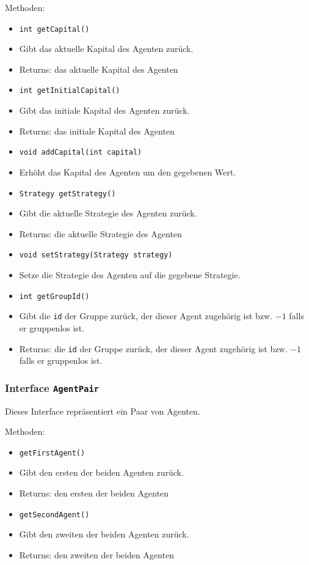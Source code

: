 \documentclass[parskip=full,11pt]{scrartcl}
\begin{document}
Methoden:
\begin{itemize}\itemsep -10pt
\item \texttt{int getCapital()}
\item[] Gibt das aktuelle Kapital des Agenten zurück.
\item[] Returns: das aktuelle Kapital des Agenten

\item \texttt{int getInitialCapital()}
\item[] Gibt das initiale Kapital des Agenten zurück.
\item[] Returns: das initiale Kapital des Agenten

\item \texttt{void addCapital(int capital)}
\item[] Erhöht das Kapital des Agenten um den gegebenen Wert.

\item \texttt{Strategy getStrategy()}
\item[] Gibt die aktuelle Strategie des Agenten zurück.
\item[] Returns: die aktuelle Strategie des Agenten

\item\texttt{void setStrategy(Strategy strategy)}
\item[] Setze die Strategie des Agenten auf die gegebene Strategie.

\item \texttt{int getGroupId()}
\item[] Gibt die \texttt{id} der Gruppe zurück, der dieser Agent zugehörig ist bzw. \(-1\) falls er gruppenlos ist.
\item[] Returns: die \texttt{id} der Gruppe zurück, der dieser Agent zugehörig ist bzw. \(-1\) falls er gruppenlos ist.
\end{itemize}

\subsubsection{Interface \texttt{AgentPair}}
Dieses Interface repräsentiert ein Paar von Agenten.

Methoden:
\begin{itemize}\itemsep -10pt
\item \texttt{getFirstAgent()}
\item[] Gibt den ersten der beiden Agenten zurück.
\item[] Returns: den ersten der beiden Agenten

\item \texttt{getSecondAgent()}
\item[] Gibt den zweiten der beiden Agenten zurück.
\item[] Returns: den zweiten der beiden Agenten
\end{itemize}
\end{document}
